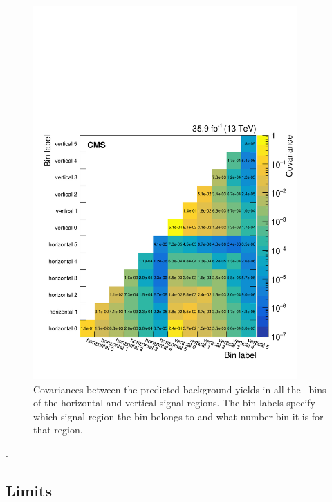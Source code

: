 \begin{figure}[hbtp]
  \centering
  \includegraphics[width=0.9\textwidth]{Analysis/Figures/correlation_matrix.pdf}
  \caption{
    Covariances between the predicted background yields in all the \ETg\ bins of the horizontal and vertical signal regions.
    The bin labels specify which signal region the bin belongs to and what number bin it is for that region.}
  \label{fig:correlation_matrix}
\end{figure}.

\subsection{Limits}
\label{subsec:limits}

